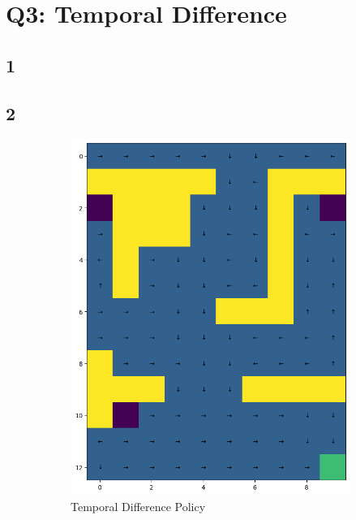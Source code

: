 \section*{Q3: Temporal Difference}
\subsection*{1}


\subsection*{2}

\begin{figure}[H]
    \centering
    \begin{subfigure}[b]{0.49\textwidth}
        \centering
        \includegraphics[width=\textwidth]{assets/td/td_policy.png}        
        \caption{Temporal Difference Policy}
    \end{subfigure}
    \hfill 
    \begin{subfigure}[b]{0.49\textwidth}

\end{subfigure}
\end{figure}
